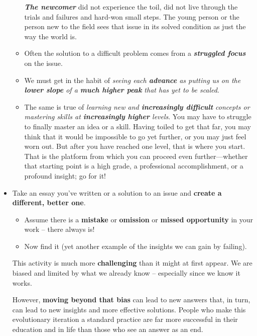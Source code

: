 \documentclass[11pt]{article}
\begin{document}
\begin{itemize}
\begin{itemize}
\emph{\textbf{The newcomer}} did not experience the toil, did not live through the trials and failures and hard-won small steps. The young person or the person new to the field sees that issue in its solved condition as just the way the world is.

\item Often the solution to a difficult problem comes from a \emph{\textbf{struggled focus}} on the issue. 

\item We must get in the habit of \emph{seeing each \textbf{advance} as putting us on the \textbf{lower slope} of a \textbf{much higher peak} that has yet to be scaled}.

\item The same is true of \emph{learning new and \textbf{increasingly difficult} concepts or mastering skills at \textbf{increasingly higher} levels}. You may have to struggle to finally master an idea or a skill. Having toiled to get that far, you may think that it would be impossible to go yet further, or you may just feel worn out. But after you have reached one level, that is where you start. That is the platform from which you can proceed even further—whether that starting point is a high grade, a professional accomplishment, or a profound insight; go for it!
\end{itemize}

\item \begin{exercise}
Take an essay you’ve written or a solution to an issue and \textbf{create a different, better one}. 
\begin{itemize}
\item Assume there is a \textbf{mistake} or \textbf{omission} or \textbf{missed opportunity} in your work -- there always is! 
\item Now find it (yet another example of the insights we can gain by failing).
\end{itemize}
This activity is much more \textbf{challenging} than it might at first appear.  We are biased and limited by what we already know -- especially since we know it works. 

However, \textbf{moving beyond that bias} can lead to new answers that, in turn, can lead to new insights and more effective solutions. People who make this evolutionary iteration a standard practice are far more successful in their education and in life than those who see an answer as an end.
\end{exercise}


\end{itemize}
\end{document}
